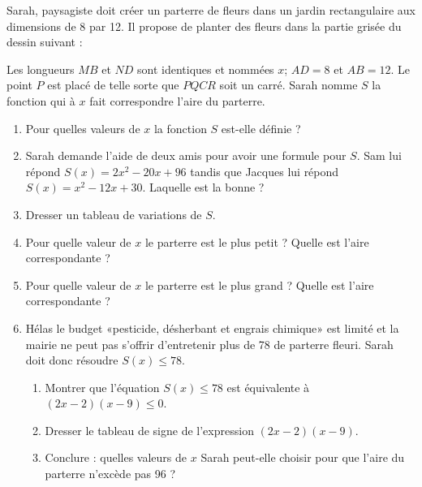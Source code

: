 
\begin{exercice}[\ldots/4]\label{exosmath-0715}

    \begin{multicols}{2}

    Sarah, paysagiste doit créer un parterre de fleurs dans un jardin rectangulaire aux dimensions de \unit{8}{\meter} par \unit{12}{\meter}. Il propose de planter des fleurs dans la partie grisée du dessin suivant :

\begin{center}
   
\end{center}

Les longueurs \( MB\) et \( ND\) sont identiques et nommées \( x\); \( AD=8\) et \( AB=12\). Le point \( P\) est placé de telle sorte que \( PQCR\) soit un carré. Sarah nomme \( S\) la fonction qui à \( x\) fait correspondre l'aire du parterre.

\begin{enumerate}
    \item
        Pour quelles valeurs de \( x\) la fonction \( S\) est-elle définie ?
    \item
        Sarah demande l'aide de deux amis pour avoir une formule pour \( S\). Sam lui répond \( S(x)=2x^2-20x+96\) tandis que Jacques lui répond \( S(x)=x^2-12x+30\). Laquelle est la bonne ?
            \item
                Dresser un tableau de variations de \( S\).
            \item
                Pour quelle valeur de \( x\) le parterre est le plus petit ? Quelle est l'aire correspondante ?
            \item
                Pour quelle valeur de \( x\) le parterre est le plus grand ? Quelle est l'aire correspondante ?
    \item
        Hélas le budget «pesticide, désherbant et engrais chimique» est limité et la mairie ne peut pas s'offrir d'entretenir plus de \unit{78}{\squared\meter} de parterre fleuri. Sarah doit donc résoudre \( S(x)\leq 78\).
        \begin{enumerate}
            \item
                Montrer que l'équation \( S(x)\leq 78\) est équivalente à \( (2x-2)(x-9)\leq 0\).
            \item
                Dresser le tableau de signe de l'expression \( (2x-2)(x-9)\).
            \item
                Conclure : quelles valeurs de \( x\) Sarah peut-elle choisir pour que l'aire du parterre n'excède pas \unit{96}{\squared\meter} ?
        \end{enumerate}
\end{enumerate}
    \end{multicols}

\end{exercice}
